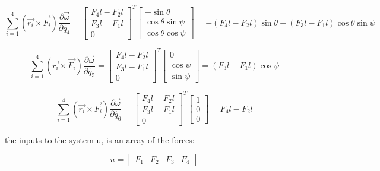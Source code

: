 \documentclass{article}
\begin{document}
\begin{equation}
\sum_{i=1}^{4}(\overrightarrow{r_{i}}\times\overrightarrow{F_{i}}) \frac{\partial\overrightarrow{\omega}}{\partial\dot{q_{4}}} =
\left[\begin{array}{c} F_4 l -F_2 l \\ F_3 l - F_1 l \\ 0\end{array}\right]^{T} \left[\begin{array}{c} -\sin{\theta} \\ \cos{\theta}\sin{\psi} \\ \cos{\theta}\cos{\psi} \end{array}\right]
= -(F_4 l -F_2 l)\sin{\theta} + (F_3 l - F_1 l) \cos{\theta}\sin{\psi}
\end{equation}

\begin{equation}
\sum_{i=1}^{4}(\overrightarrow{r_{i}}\times\overrightarrow{F_{i}}) \frac{\partial\overrightarrow{\omega}}{\partial\dot{q_{5}}} =
\left[\begin{array}{c} F_4 l -F_2 l \\ F_3 l - F_1 l \\ 0\end{array}\right]^{T} \left[\begin{array}{c} 0 \\ \cos{\psi} \\ \sin{\psi} \end{array}\right]
= (F_3 l - F_1 l)\cos{\psi}
\end{equation}

\begin{equation}
\sum_{i=1}^{4}(\overrightarrow{r_{i}}\times\overrightarrow{F_{i}}) \frac{\partial\overrightarrow{\omega}}{\partial\dot{q_{6}}} =
\left[\begin{array}{c} F_4 l -F_2 l \\ F_3 l - F_1 l \\ 0\end{array}\right]^{T} \left[\begin{array}{c} 1 \\ 0 \\ 0\end{array}\right]
= F_4 l -F_2 l
\end{equation}


the inputs to the system u, is an array of the forces:

\begin{equation}
u = [\begin{array}{cccc}
F_1 & F_2 & F_3 & F_4\end{array}]
\end{equation}
\end{document}
